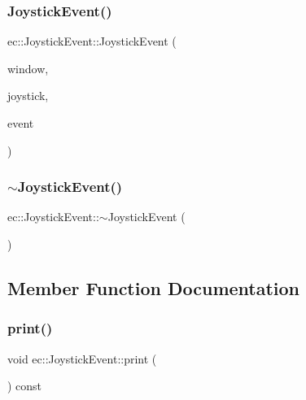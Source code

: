 \subsubsection{\texorpdfstring{Joystick\+Event()}{JoystickEvent()}\hspace{0.1cm}{\footnotesize\ttfamily [2/2]}}
{\footnotesize\ttfamily ec\+::\+Joystick\+Event\+::\+Joystick\+Event (\begin{DoxyParamCaption}\item[{G\+L\+F\+Wwindow $\ast$}]{window,  }\item[{int}]{joystick,  }\item[{int}]{event }\end{DoxyParamCaption})\hspace{0.3cm}{\ttfamily [explicit]}}

\mbox{\label{structec_1_1_joystick_event_a182ea7dcfcd2e363909eb8ea63a41df8}} 
\subsubsection{\texorpdfstring{$\sim$\+Joystick\+Event()}{~JoystickEvent()}}
{\footnotesize\ttfamily ec\+::\+Joystick\+Event\+::$\sim$\+Joystick\+Event (\begin{DoxyParamCaption}{ }\end{DoxyParamCaption})\hspace{0.3cm}{\ttfamily [default]}}



\subsection{Member Function Documentation}
\mbox{\label{structec_1_1_joystick_event_a8fe710e92962e5b7376167deeac260d7}} 
\subsubsection{\texorpdfstring{print()}{print()}}
{\footnotesize\ttfamily void ec\+::\+Joystick\+Event\+::print (\begin{DoxyParamCaption}{ }\end{DoxyParamCaption}) const}



